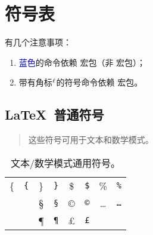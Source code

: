 \def\lsym{$\mathsurround=0pt {}^\ell$}
\def\LSYM    #1{$#1$     & \texttt{\string#1}\lsym}

\def\SYM     #1{$#1$     & \texttt{\string#1}}
\def\BIGSYM  #1{$#1$     & $\displaystyle #1$ & \texttt{\string#1}}
\def\ACC   #1#2{$#1{#2}$ & \texttt{\string#1}\marg*{#2}}
\def\DEL     #1{$\big#1 \bigg#1$ & \texttt{\string#1}}

\def\AMSSYM  #1{$#1$     & \texttt{\string#1}}
\def\AMSM    #1{$#1$     & \textcolor{blue}{\texttt{\string#1}}}
\def\AMSACC#1#2{$#1{#2}$ & \textcolor{blue}{\texttt{\string#1}}\marg*{#2}}
\def\AMSBIG  #1{$#1$     & $\displaystyle #1$ & \textcolor{blue}{\texttt{\string#1}}}

\def\SC      #1{#1       & \texttt{\string#1}}

\newenvironment{symbols}[1]%
  {\small\def\arraystretch{1.1}
  \begin{tabular}{@{}#1@{}}}%
  {\end{tabular}}

\clearpage
\section{符号表}\label{sec:math-tables}

有几个注意事项：
\begin{enumerate}
  \item \textcolor{blue}{蓝色}的命令依赖  宏包（非  宏包）；
  \item 带有角标\lsym 的符号命令依赖  宏包。
\end{enumerate}

\subsection{\LaTeX\ 普通符号}

\begin{table}[htp]
\centering
\caption{文本/数学模式通用符号。}\label{tbl:general-syms}
\begin{quote}\footnotesize%
这些符号可用于文本和数学模式。
\end{quote}
\begin{symbols}{*4{cl}}
\hline
 \SC{\{}    &  \SC{\}}  &  \SC{\$}         &  \SC{\%}               \\
 \SC{\dag}  &  \SC{\S}  &  \SC{\copyright} &  \SC{\dots}            \\
 \SC{\ddag} &  \SC{\P}  &  \SC{\pounds}    &                        \\
\hline
\end{symbols}
\end{table}

